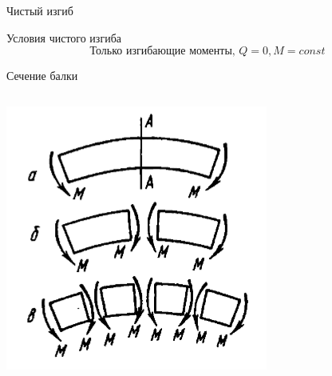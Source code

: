 \documentclass[ignoreonframetext,unicode]{beamer}
\begin{document}
		\begin{frame}{Чистый изгиб}
				\begin{block}{Условия чистого изгиба}	
				\[
				\mbox{Только изгибающие моменты, }
				Q = 0, M = const
				\]
			\end{block}
			
		Сечение балки
		\begin{columns}
			\includegraphics[width=\textwidth]{pic.2}
		\end{columns}
		\end{frame}
\end{document}
